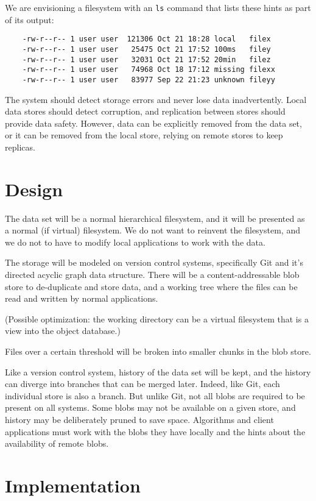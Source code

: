\documentclass[a4paper]{article}
\begin{document}
We are envisioning a filesystem with an \lstinline{ls} command that lists these
hints as part of its output:

\begin{lstlisting}
    -rw-r--r-- 1 user user  121306 Oct 21 18:28 local   filex
    -rw-r--r-- 1 user user   25475 Oct 21 17:52 100ms   filey
    -rw-r--r-- 1 user user   32031 Oct 21 17:52 20min   filez
    -rw-r--r-- 1 user user   74968 Oct 18 17:12 missing filexx
    -rw-r--r-- 1 user user   83977 Sep 22 21:23 unknown fileyy
\end{lstlisting}

The system should detect storage errors and never lose data inadvertently. Local
data stores should detect corruption, and replication between stores should
provide data safety. However, data can be explicitly removed from the data set,
or it can be removed from the local store, relying on remote stores to keep
replicas.


\section{Design}\label{design}

The data set will be a normal hierarchical filesystem, and it will be presented
as a normal (if virtual) filesystem. We do not want to reinvent the filesystem,
and we do not to have to modify local applications to work with the data.

The storage will be modeled on version control systems, specifically Git and
it's directed acyclic graph data structure. There will be a content-addressable
blob store to de-duplicate and store data, and a working tree where the files
can be read and written by normal applications.

(Possible optimization: the working directory can be a virtual filesystem that
is a view into the object database.)

Files over a certain threshold will be broken into smaller chunks in the blob
store.

Like a version control system, history of the data set will be kept, and the
history can diverge into branches that can be merged later. Indeed, like Git,
each individual store is also a branch. But unlike Git, not all blobs are
required to be present on all systems. Some blobs may not be available on a
given store, and history may be deliberately pruned to save space. Algorithms
and client applications must work with the blobs they have locally and the hints
about the availability of remote blobs.


\section{Implementation}\label{implementation}




% 
% 
\end{document}
